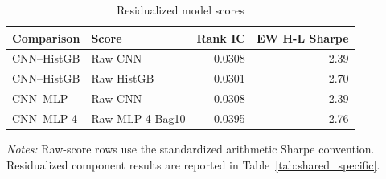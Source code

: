 \begin{table}[htbp]
\centering
\caption{Residualized model scores}
\label{tab:complementarity_residual}
\begin{tabular}{llrr}
\toprule
Comparison & Score & Rank IC & EW H-L Sharpe \\
\midrule
CNN--HistGB & Raw CNN & 0.0308 & 2.39 \\
CNN--HistGB & Raw HistGB & 0.0301 & 2.70 \\
\midrule
CNN--MLP & Raw CNN & 0.0308 & 2.39 \\
CNN--MLP-4 & Raw MLP-4 Bag10 & 0.0395 & 2.76 \\
\bottomrule
\end{tabular}
\begin{minipage}{0.92\linewidth}
\footnotesize
\textit{Notes:} Raw-score rows use the standardized arithmetic Sharpe convention. Residualized component results are reported in Table~\ref{tab:shared_specific}.
\end{minipage}
\end{table}
